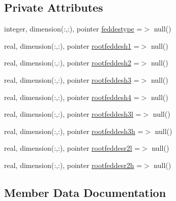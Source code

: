 \subsection*{Private Attributes}
\begin{DoxyCompactItemize}
\item 
integer, dimension(\+:,\+:), pointer \mbox{\hyperlink{structmodulevegetation_1_1t__transpirationmohid_a4c2af71e25ff0bcda7b3fd567a0b0e65}{feddestype}} =$>$ null()
\item 
real, dimension(\+:,\+:), pointer \mbox{\hyperlink{structmodulevegetation_1_1t__transpirationmohid_ab74a46a290e59da05b5d53159897f398}{rootfeddesh1}} =$>$ null()
\item 
real, dimension(\+:,\+:), pointer \mbox{\hyperlink{structmodulevegetation_1_1t__transpirationmohid_ac0c3718dc78643a9ad6f7bf4e8134439}{rootfeddesh2}} =$>$ null()
\item 
real, dimension(\+:,\+:), pointer \mbox{\hyperlink{structmodulevegetation_1_1t__transpirationmohid_a878602eb75417c4a797175e293560c10}{rootfeddesh3}} =$>$ null()
\item 
real, dimension(\+:,\+:), pointer \mbox{\hyperlink{structmodulevegetation_1_1t__transpirationmohid_a86791cb6d6223823e24222c3fecae272}{rootfeddesh4}} =$>$ null()
\item 
real, dimension(\+:,\+:), pointer \mbox{\hyperlink{structmodulevegetation_1_1t__transpirationmohid_aa8c006985ef4da4243daee47a67a6f8f}{rootfeddesh3l}} =$>$ null()
\item 
real, dimension(\+:,\+:), pointer \mbox{\hyperlink{structmodulevegetation_1_1t__transpirationmohid_ab6e58fd2954b17a75056f06626feb36d}{rootfeddesh3h}} =$>$ null()
\item 
real, dimension(\+:,\+:), pointer \mbox{\hyperlink{structmodulevegetation_1_1t__transpirationmohid_a2da1f6199c7e8526ef095b7fbb3ce3bd}{rootfeddesr2l}} =$>$ null()
\item 
real, dimension(\+:,\+:), pointer \mbox{\hyperlink{structmodulevegetation_1_1t__transpirationmohid_a2e78f687bbe4c55b0adac3160ab1731b}{rootfeddesr2h}} =$>$ null()
\end{DoxyCompactItemize}


\subsection{Member Data Documentation}
\mbox{\label{structmodulevegetation_1_1t__transpirationmohid_a4c2af71e25ff0bcda7b3fd567a0b0e65}} 

